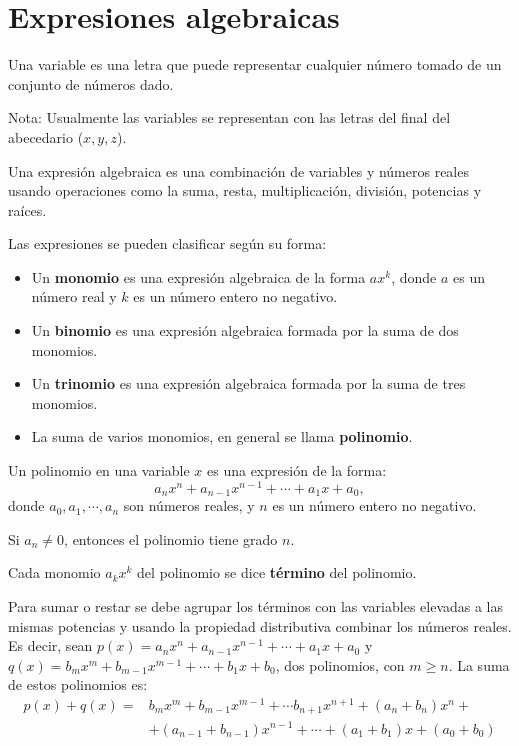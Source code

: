\documentclass[a4,11pt]{aleph-notas}
\begin{document}
\encabezado

\section{Expresiones algebraicas}

\begin{defi}[Variable]
    Una variable es una letra que puede representar cualquier n\'umero tomado de un conjunto de n\'umeros dado.
\end{defi}
Nota: Usualmente las variables se representan con las letras del final del abecedario ($x,y,z$). 

\begin{defi}
    Una expresi\'on algebraica es una combinaci\'on de variables y n\'umeros reales usando operaciones como la suma, resta, multiplicaci\'on, divisi\'on, potencias y ra\'ices.
    
    Las expresiones se pueden clasificar seg\'un su forma:
    \begin{itemize}
    	\item Un \textbf{monomio} es una expresi\'on algebraica de la forma $ax^k$, donde $a$ es un n\'umero real y $k$ es un n\'umero entero no negativo.
    	\item Un \textbf{binomio} es una expresi\'on algebraica formada por la suma de dos monomios.
    	\item Un \textbf{trinomio} es una expresi\'on algebraica formada por la suma de tres monomios.
    	\item La suma de varios monomios, en general se llama \textbf{polinomio}.
    \end{itemize}
\end{defi}

\begin{defi}[Polinomio]
     Un polinomio en una variable $x$ es una expresi\'on de la forma:
     $$
     a_nx^n + a_{n-1}x^{n-1} + \cdots + a_1 x + a_0,
     $$
     donde $a_0,a_1,\cdots,a_n$ son n\'umeros reales, y $n$ es un n\'umero entero no negativo.
     
     Si $a_n\neq 0$, entonces el polinomio tiene grado $n$.
     
     Cada monomio $a_kx^k$ del polinomio se dice \textbf{t\'ermino} del polinomio.
\end{defi}

\begin{prop}
    Para sumar o restar se debe agrupar los t\'erminos con las variables elevadas a las mismas potencias y usando la propiedad distributiva combinar los n\'umeros reales. Es decir, sean $p(x) = a_nx^n + a_{n-1}x^{n-1} + \cdots + a_1 x + a_0$ y $q(x) = b_mx^m + b_{m-1}x^{m-1} + \cdots + b_1 x + b_0$, dos polinomios, con $m \geq n$. La suma de estos polinomios es:
    $$
    \begin{aligned}
    	p(x)+q(x) =& b_mx^m + b_{m-1}x^{m-1} + \cdots b_{n+1}x^{n+1}+ (a_n+b_n)x^n +\\
    	&+ (a_{n-1}+b_{n-1})x^{n-1} + \cdots + (a_1+b_1) x + (a_0+b_0)
    \end{aligned}
    $$
\end{prop}
\end{document}
